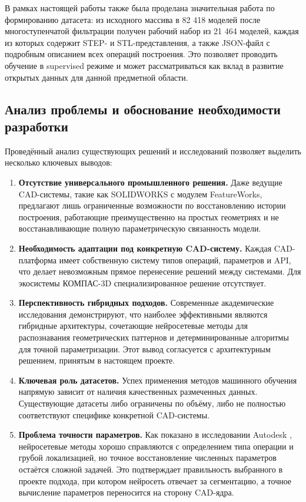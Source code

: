 В рамках настоящей работы также была проделана значительная работа по формированию датасета: из исходного массива в 82 418 моделей после многоступенчатой фильтрации получен рабочий набор из 21 464 моделей, каждая из которых содержит STEP- и STL-представления, а также JSON-файл с подробным описанием всех операций построения. Это позволяет проводить обучение в supervised режиме и может рассматриваться как вклад в развитие открытых данных для данной предметной области.

\subsection{Анализ проблемы и обоснование необходимости разработки}

Проведённый анализ существующих решений и исследований позволяет выделить несколько ключевых выводов:

\begin{enumerate}
    \item \textbf{Отсутствие универсального промышленного решения.} Даже ведущие CAD-системы, такие как SOLIDWORKS с модулем FeatureWorks, предлагают лишь ограниченные возможности по восстановлению истории построения, работающие преимущественно на простых геометриях и не восстанавливающие полную параметрическую связанность модели.
    
    \item \textbf{Необходимость адаптации под конкретную CAD-систему.} Каждая CAD-платформа имеет собственную систему типов операций, параметров и API, что делает невозможным прямое перенесение решений между системами. Для экосистемы КОМПАС-3D специализированное решение отсутствует.
    
    \item \textbf{Перспективность гибридных подходов.} Современные академические исследования \cite{dupont2025design} \cite{chen2025cadcrafter} демонстрируют, что наиболее эффективными являются гибридные архитектуры, сочетающие нейросетевые методы для распознавания геометрических паттернов и детерминированные алгоритмы для точной параметризации. Этот вывод согласуется с архитектурным решением, принятым в настоящем проекте.
    
    \item \textbf{Ключевая роль датасетов.} Успех применения методов машинного обучения напрямую зависит от наличия качественных размеченных данных. Существующие датасеты либо ограничены по объёму, либо не полностью соответствуют специфике конкретной CAD-системы.
    
    \item \textbf{Проблема точности параметров.} Как показано в исследовании Autodesk \cite{autodesk2020fusion}, нейросетевые методы хорошо справляются с определением типа операции и грубой локализацией, но точное восстановление численных параметров остаётся сложной задачей. Это подтверждает правильность выбранного в проекте подхода, при котором нейросеть отвечает за сегментацию, а точное вычисление параметров переносится на сторону CAD-ядра.
\end{enumerate}

